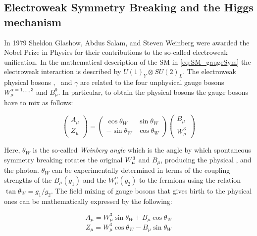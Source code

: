 		\subsection*{Electroweak Symmetry Breaking and the Higgs mechanism}

			In 1979 Sheldon Glashow, Abdus Salam, and Steven Weinberg were awarded the Nobel Prize in Physics for their contributions to the so-called electroweak unification. In the mathematical description of the SM in \ref{eq:SM_gaugeSym} the electroweak interaction is described by $U(1)_Y \otimes SU(2)_L$. The electroweak physical bosons \Wboson, \Zboson\ and $\gamma$ are related to the four unphysical gauge bosons $W_{\mu}^{\alpha = 1,\dots,3}$ and $B_\mu^0$. In particular, to obtain the physical bosons the gauge bosons have to mix as follows:

			\begin{equation}
			\label{eq:mixing}
					\begin{pmatrix} A_{\mu} \\ Z_{\mu} \end{pmatrix}					
					= 
					\begin{pmatrix}
							\cos\theta_W & \sin\theta_W \\ 
							-\sin\theta_W & \cos\theta_W
						\end{pmatrix}
					\begin{pmatrix}
						B_{\mu} \\ W_{\mu}^3
						\end{pmatrix}
			\end{equation}

			Here, $\theta_W$ is the so-called \emph{Weinberg angle} which is the angle by which spontaneous symmetry breaking rotates the original $W_{\mu}^3$ and $B_{\mu}$, producing the physical \Zboson, and the photon. $\theta_W$ can be experimentally determined in terms of the coupling strengths of the $B_{\mu}(g_1)$ and the $W_{\mu}^\alpha (g_2)$ to the fermions using the relation $\tan\theta_W = g_1 / g_2 $. The field mixing of gauge bosons that gives birth to the physical ones can be mathematically expressed by the following:

			\begin{equation}
			\label{eq:photon}
				A_{\mu} = W_{\mu}^3 \sin\theta_W  + B_{\mu}\cos \theta_W 
			\end{equation}
			\begin{equation}
			\label{eq:Zboson}
				Z_{\mu} = W_{\mu}^3\cos\theta_W  - B_{\mu} \sin \theta_W
			\end{equation}

